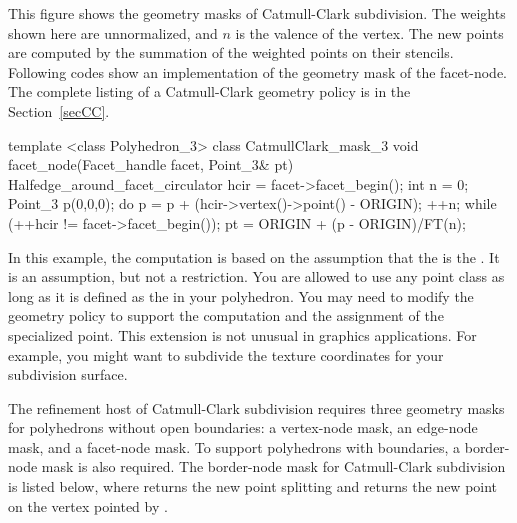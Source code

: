 This figure shows the geometry masks of
Catmull-Clark subdivision. The weights shown here are unnormalized, 
and $n$ is the valence of the vertex. The new points are 
computed by the summation of the weighted points on their stencils.
Following codes show an implementation of the geometry mask of 
the facet-node. The complete listing
of a Catmull-Clark geometry policy is in the Section~\ref{secCC}.

\begin{ccExampleCode}
template <class Polyhedron_3>
class CatmullClark_mask_3 {
  void facet_node(Facet_handle facet, Point_3& pt) {
    Halfedge_around_facet_circulator hcir = facet->facet_begin();
    int n = 0;
    Point_3 p(0,0,0);
    do {
      p = p + (hcir->vertex()->point() - ORIGIN);
      ++n;
    } while (++hcir != facet->facet_begin());
    pt = ORIGIN + (p - ORIGIN)/FT(n);
  }
}
\end{ccExampleCode}

In this example, the computation is based on the assumption that
the  is the . It is an assumption, 
but not a restriction.
You are allowed to use any point class as long as it is
defined as the  in your polyhedron.
You may need to modify the geometry policy to support the computation
and the assignment of the specialized point. This extension is not unusual 
in graphics applications. For example, you might want to subdivide the
texture coordinates for your subdivision surface. 

The refinement host of Catmull-Clark subdivision
requires three geometry masks for 
polyhedrons without open boundaries: a vertex-node 
mask, an edge-node mask, and a facet-node mask. 
To support polyhedrons with boundaries, a border-node mask is 
also required. The border-node mask for Catmull-Clark subdivision
is listed below, where  returns the new point splitting 
 and  returns the new point on the vertex pointed by
.  


